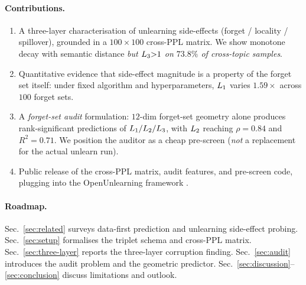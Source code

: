 \paragraph{Contributions.}
\begin{enumerate}
    \setlength\itemsep{0.2em}
    \item A three-layer characterisation of unlearning side-effects (forget / locality / spillover), grounded in a $100\times100$ cross-PPL matrix. We show monotone decay with semantic distance \emph{but $L_3{>}1$ on $73.8\%$ of cross-topic samples}.
    \item Quantitative evidence that side-effect magnitude is a property of the forget set itself: under fixed algorithm and hyperparameters, $L_1$ varies $1.59\times$ across $100$ forget sets.
    \item A \emph{forget-set audit} formulation: $12$-dim forget-set geometry alone produces rank-significant predictions of $L_1/L_2/L_3$, with $L_2$ reaching $\rho{=}0.84$ and $R^2{=}0.71$. We position the auditor as a cheap pre-screen (\emph{not} a replacement for the actual unlearn run).
    \item Public release of the cross-PPL matrix, audit features, and pre-screen code, plugging into the OpenUnlearning framework \citep{dorna2025openunlearning}.
\end{enumerate}

\paragraph{Roadmap.} Sec.~\ref{sec:related} surveys data-first prediction and unlearning side-effect probing. Sec.~\ref{sec:setup} formalises the triplet schema and cross-PPL matrix. Sec.~\ref{sec:three-layer} reports the three-layer corruption finding. Sec.~\ref{sec:audit} introduces the audit problem and the geometric predictor. Sec.~\ref{sec:discussion}--\ref{sec:conclusion} discuss limitations and outlook.
